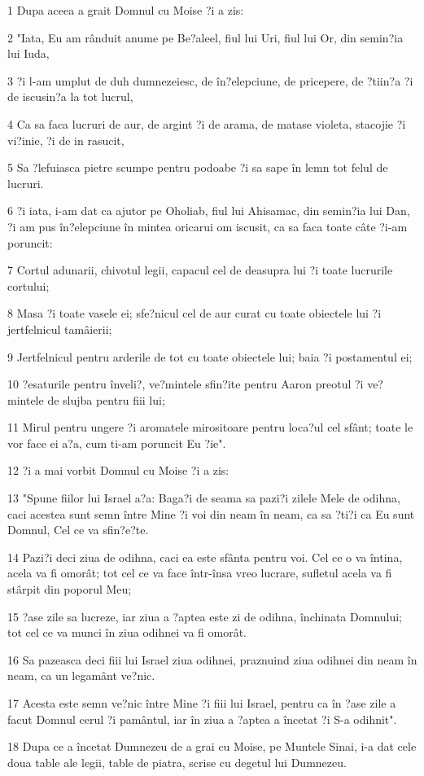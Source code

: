 \par 1 Dupa aceea a grait Domnul cu Moise ?i a zis:
\par 2 "Iata, Eu am rânduit anume pe Be?aleel, fiul lui Uri, fiul lui Or, din semin?ia lui Iuda,
\par 3 ?i l-am umplut de duh dumnezeiesc, de în?elepciune, de pricepere, de ?tiin?a ?i de iscusin?a la tot lucrul,
\par 4 Ca sa faca lucruri de aur, de argint ?i de arama, de matase violeta, stacojie ?i vi?inie, ?i de in rasucit,
\par 5 Sa ?lefuiasca pietre scumpe pentru podoabe ?i sa sape în lemn tot felul de lucruri.
\par 6 ?i iata, i-am dat ca ajutor pe Oholiab, fiul lui Ahisamac, din semin?ia lui Dan, ?i am pus în?elepciune în mintea oricarui om iscusit, ca sa faca toate câte ?i-am poruncit:
\par 7 Cortul adunarii, chivotul legii, capacul cel de deasupra lui ?i toate lucrurile cortului;
\par 8 Masa ?i toate vasele ei; sfe?nicul cel de aur curat cu toate obiectele lui ?i jertfelnicul tamâierii;
\par 9 Jertfelnicul pentru arderile de tot cu toate obiectele lui; baia ?i postamentul ei;
\par 10 ?esaturile pentru înveli?, ve?mintele sfin?ite pentru Aaron preotul ?i ve?mintele de slujba pentru fiii lui;
\par 11 Mirul pentru ungere ?i aromatele mirositoare pentru loca?ul cel sfânt; toate le vor face ei a?a, cum ti-am poruncit Eu ?ie".
\par 12 ?i a mai vorbit Domnul cu Moise ?i a zis:
\par 13 "Spune fiilor lui Israel a?a: Baga?i de seama sa pazi?i zilele Mele de odihna, caci acestea sunt semn între Mine ?i voi din neam în neam, ca sa ?ti?i ca Eu sunt Domnul, Cel ce va sfin?e?te.
\par 14 Pazi?i deci ziua de odihna, caci ea este sfânta pentru voi. Cel ce o va întina, acela va fi omorât; tot cel ce va face într-însa vreo lucrare, sufletul acela va fi stârpit din poporul Meu;
\par 15 ?ase zile sa lucreze, iar ziua a ?aptea este zi de odihna, închinata Domnului; tot cel ce va munci în ziua odihnei va fi omorât.
\par 16 Sa pazeasca deci fiii lui Israel ziua odihnei, praznuind ziua odihnei din neam în neam, ca un legamânt ve?nic.
\par 17 Acesta este semn ve?nic între Mine ?i fiii lui Israel, pentru ca în ?ase zile a facut Domnul cerul ?i pamântul, iar în ziua a ?aptea a încetat ?i S-a odihnit".
\par 18 Dupa ce a încetat Dumnezeu de a grai cu Moise, pe Muntele Sinai, i-a dat cele doua table ale legii, table de piatra, scrise cu degetul lui Dumnezeu.

